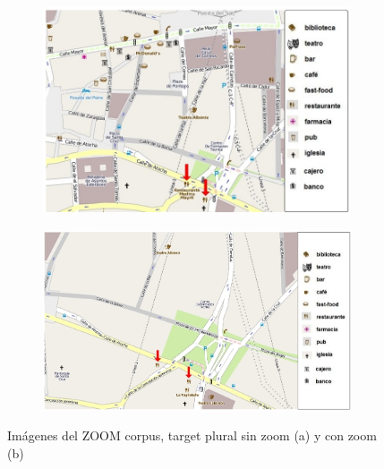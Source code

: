 \begin{figure}[H]
\begin{subfigure}{.47\textwidth}
\centering
\includegraphics[width=\textwidth]{images/corpus/mapa10.png}\\[0pt]
\caption{}
\label{pluralx}
\end{subfigure}
\begin{subfigure}{.53\textwidth}
\centering
\includegraphics[width=\textwidth]{images/corpus/mapa20.png}\\[0pt]
\caption{}
\label{plural2x}
\end{subfigure}
\caption{Im\'agenes del ZOOM corpus, target plural sin zoom (a) y con zoom (b)}\label{imagenes-zoom-corpus}
\end{figure}

